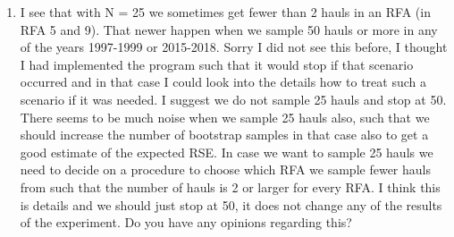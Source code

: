 \documentclass[a4paper 12pt]{article}
\numberwithin{equation}{section}
\newcommand{\ed}[1]{\textcolor{red}{#1}}
\newcommand{\olav}[1]{\textcolor{darkgreen}{#1}}
\begin{document}
\begin{enumerate}
\item I see that with N = 25 we sometimes get fewer than 2 hauls in an RFA (in RFA 5 and 9).   That newer happen when we sample 50 hauls or more in any of the years 1997-1999 or 2015-2018. Sorry I did not see this before, I thought I had implemented the program such that it would stop if that scenario occurred and in that case I could look into the details how to treat such a scenario if it was needed. I suggest we do not sample 25 hauls and stop at 50. There seems to be much noise when we sample 25 hauls also, such that we should increase the number of bootstrap samples in that case also to get a good estimate of the expected RSE. In case we want to sample 25 hauls we need to decide on a procedure to choose which RFA we sample fewer hauls from such that the number of hauls is 2 or larger for every RFA. I think this is details and we should just stop at 50, it does not change any of the results of the experiment. Do you have any opinions regarding this?



\end{enumerate}
\end{document}

